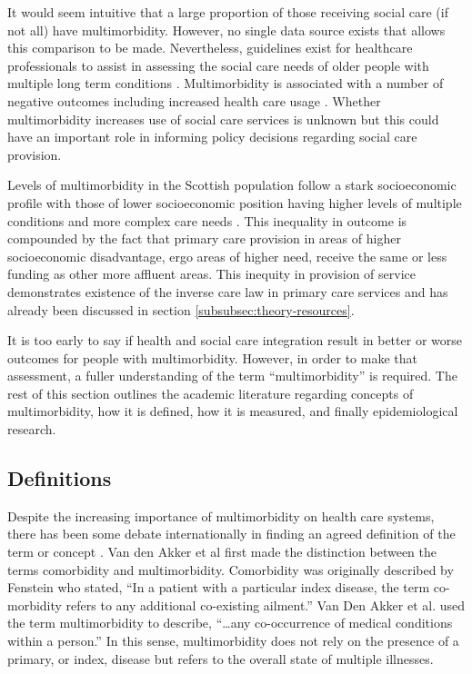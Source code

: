 \documentclass[12pt,]{report}
\begin{document}
It would seem intuitive that a large proportion of those receiving
social care (if not all) have multimorbidity. However, no single data
source exists that allows this comparison to be made. Nevertheless,
guidelines exist for healthcare professionals to assist in assessing the
social care needs of older people with multiple long term conditions
\citep{RN150}. Multimorbidity is associated with a number of negative
outcomes including increased health care usage \citep{RN226}. Whether
multimorbidity increases use of social care services is unknown but this
could have an important role in informing policy decisions regarding
social care provision.

Levels of multimorbidity in the Scottish population follow a stark
socioeconomic profile with those of lower socioeconomic position having
higher levels of multiple conditions and more complex care needs
\citep{RN33, RN21}. This inequality in outcome is compounded by the fact
that primary care provision in areas of higher socioeconomic
disadvantage, ergo areas of higher need, receive the same or less
funding as other more affluent areas. This inequity in provision of
service demonstrates existence of the inverse care law in primary care
services \citep{RN120, RN39, RN148} and has already been discussed in
section \ref{subsubsec:theory-resources}.

It is too early to say if health and social care integration result in
better or worse outcomes for people with multimorbidity. However, in
order to make that assessment, a fuller understanding of the term
``multimorbidity'' is required. The rest of this section outlines the
academic literature regarding concepts of multimorbidity, how it is
defined, how it is measured, and finally epidemiological research.

\subsection{Definitions}\label{subsec:mm-defs}

Despite the increasing importance of multimorbidity on health care
systems, there has been some debate internationally in finding an agreed
definition of the term or concept \citep{RN89, RN95}. Van den Akker et
al \citeyearpar{RN19} first made the distinction between the terms
comorbidity and multimorbidity. Comorbidity was originally described by
Fenstein \citep[pp.467]{RN338} who stated, ``In a patient with a
particular index disease, the term co-morbidity refers to any additional
co-existing ailment.'' Van Den Akker et al. \citeyearpar[pp.65]{RN19}
used the term multimorbidity to describe, ``\ldots{}any co-occurrence of
medical conditions within a person.'' In this sense, multimorbidity does
not rely on the presence of a primary, or index, disease but refers to
the overall state of multiple illnesses.
\end{document}
